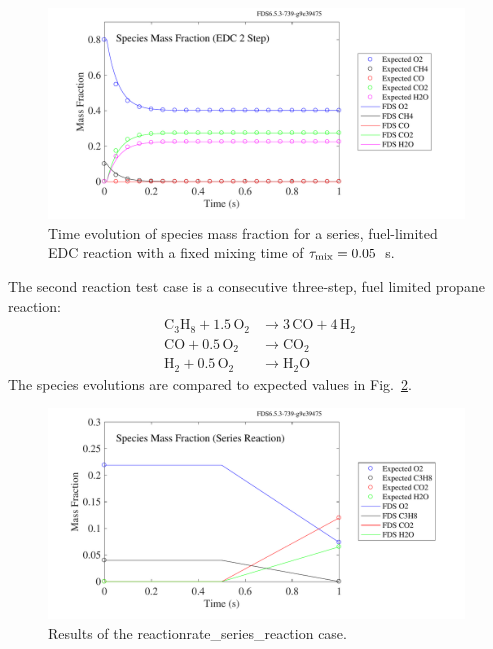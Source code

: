 \documentclass[11pt]{book}
\begin{document}
\begin{figure}[!ht]
\centering
\includegraphics[height=2.2in]{SCRIPT_FIGURES/reactionrate_EDC_flim_2step}
\caption[Species evolution in 2-step methane EDC reaction]{Time evolution of species mass fraction for a series, fuel-limited EDC reaction with a fixed mixing time of $\tau_{\rm mix}=0.05$~s.}
\label{fig:EDC_2Step_fuel}
\end{figure}

The second reaction test case is a consecutive three-step, fuel limited propane reaction:
\begin{align}\label{eq:3step_propane}
\mathrm{C_3H_8 + 1.5 \, O_2} &\rightarrow  \mathrm{3 \,CO + 4 \, H_2} \\
\nonumber \mathrm{CO + 0.5 \, O_2} &\rightarrow \mathrm{CO_2} \\
\nonumber \mathrm{H_2 + 0.5 \, O_2} &\rightarrow \mathrm{H_2O}
\end{align}
The species evolutions are compared to expected values in Fig.~\ref{fig:reactionrate_series_reaction}.

\begin{figure}[!ht]
\centering
\includegraphics[height=2.2in]{SCRIPT_FIGURES/reactionrate_series_reaction}
\caption[Results of the {\ct reactionrate\_series\_reaction} case]{Results of the {\ct reactionrate\_series\_reaction} case.}
\label{fig:reactionrate_series_reaction}
\end{figure}
\end{document}
